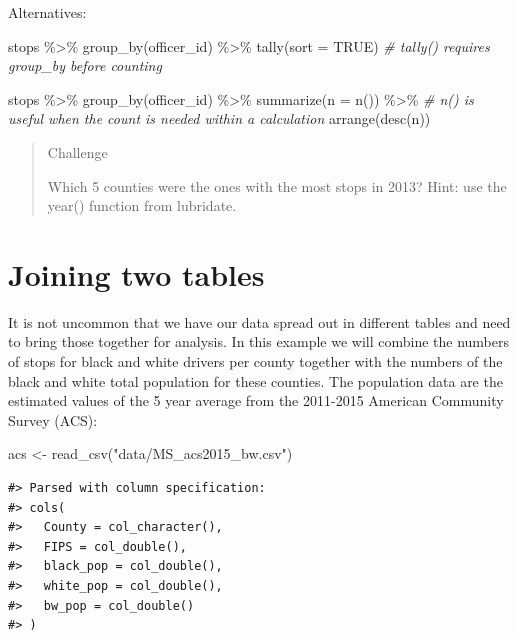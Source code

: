 \documentclass[
]{book}
\newenvironment{Shaded}{\begin{snugshade}}{\end{snugshade}}
\newcommand{\AttributeTok}[1]{\textcolor[rgb]{0.77,0.63,0.00}{#1}}
\newcommand{\CommentTok}[1]{\textcolor[rgb]{0.56,0.35,0.01}{\textit{#1}}}
\newcommand{\ConstantTok}[1]{\textcolor[rgb]{0.00,0.00,0.00}{#1}}
\newcommand{\FunctionTok}[1]{\textcolor[rgb]{0.00,0.00,0.00}{#1}}
\newcommand{\NormalTok}[1]{#1}
\newcommand{\OtherTok}[1]{\textcolor[rgb]{0.56,0.35,0.01}{#1}}
\newcommand{\SpecialCharTok}[1]{\textcolor[rgb]{0.00,0.00,0.00}{#1}}
\newcommand{\StringTok}[1]{\textcolor[rgb]{0.31,0.60,0.02}{#1}}
\begin{document}
Alternatives:

\begin{Shaded}
\begin{Highlighting}[]
\NormalTok{stops }\SpecialCharTok{\%\textgreater{}\%}
  \FunctionTok{group\_by}\NormalTok{(officer\_id) }\SpecialCharTok{\%\textgreater{}\%} 
  \FunctionTok{tally}\NormalTok{(}\AttributeTok{sort =} \ConstantTok{TRUE}\NormalTok{) }\CommentTok{\# tally() requires group\_by before counting}

\NormalTok{stops }\SpecialCharTok{\%\textgreater{}\%}
  \FunctionTok{group\_by}\NormalTok{(officer\_id) }\SpecialCharTok{\%\textgreater{}\%}
  \FunctionTok{summarize}\NormalTok{(}\AttributeTok{n =} \FunctionTok{n}\NormalTok{()) }\SpecialCharTok{\%\textgreater{}\%} \CommentTok{\# n() is useful when the count is needed within a calculation}
  \FunctionTok{arrange}\NormalTok{(}\FunctionTok{desc}\NormalTok{(n))}
\end{Highlighting}
\end{Shaded}

\begin{quote}
Challenge

Which 5 counties were the ones with the most stops in 2013?
Hint: use the year() function from lubridate.
\end{quote}

\hypertarget{joining-two-tables}{%
\section{Joining two tables}\label{joining-two-tables}}

It is not uncommon that we have our data spread out in different tables and need to bring those together for analysis. In this example we will combine the numbers of stops for black and white drivers per county together with the numbers of the black and white total population for these counties. The population data are the estimated values of the 5 year average from the 2011-2015 American Community Survey (ACS):

\begin{Shaded}
\begin{Highlighting}[]
\NormalTok{acs }\OtherTok{\textless{}{-}} \FunctionTok{read\_csv}\NormalTok{(}\StringTok{"data/MS\_acs2015\_bw.csv"}\NormalTok{)}
\end{Highlighting}
\end{Shaded}

\begin{verbatim}
#> Parsed with column specification:
#> cols(
#>   County = col_character(),
#>   FIPS = col_double(),
#>   black_pop = col_double(),
#>   white_pop = col_double(),
#>   bw_pop = col_double()
#> )
\end{verbatim}
\end{document}
